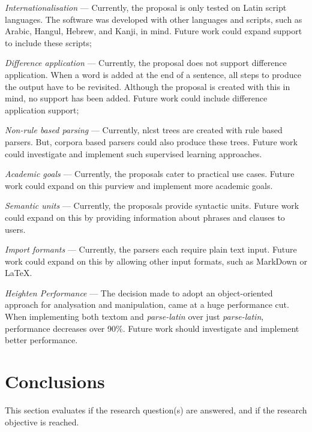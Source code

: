 \begin{aenumerate}
\item\emph{Internationalisation} --- Currently, the proposal is only
    tested on Latin script languages.
  The software was developed with other languages and scripts, such as
    Arabic, Hangul, Hebrew, and Kanji, in mind.
  Future work could expand support to include these scripts;
\item\emph{Difference application} --- Currently, the proposal does not
    support difference application.
  When a word is added at the end of a sentence, all steps to produce the
    output have to be revisited.
  Although the proposal is created with this in mind, no support has been
    added.
  Future work could include difference application support;
\item\emph{Non-rule based parsing} --- Currently, \gls{nlcst} trees are
    created with rule based parsers.
  But, corpora based parsers could also produce these trees.
  Future work could investigate and implement such supervised learning
    approaches.
\item\emph{Academic goals} --- Currently, the proposals cater to practical use
    cases.
  Future work could expand on this purview and implement more academic
    goals.
\item\emph{Semantic units} --- Currently, the proposals provide syntactic
    units.
  Future work could expand on this by providing information about phrases
    and clauses to users.
\item\emph{Import formants} --- Currently, the parsers each require plain
    text input.
  Future work could expand on this by allowing other input formats, such as
    MarkDown or \LaTeX.
\item\emph{Heighten Performance} --- The decision made to adopt an
    object-oriented approach for analysation and manipulation, came at a huge
    performance cut.
  When implementing both \gls{textom} and \emph{parse-latin} over just
    \emph{parse-latin}, performance decreases over 90\%.
  Future work should investigate and implement better performance.
\end{aenumerate}

\section{Conclusions}\label{conclusions}

This section evaluates if the research question(s) are answered, and if the
  research objective is reached.


